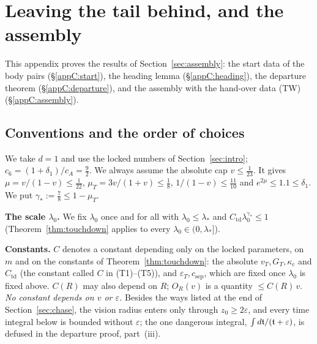 \section{Leaving the tail behind, and the assembly}\label{app:C}

This appendix proves the results of Section~\ref{sec:assembly}: the start data of the body pairs
(\S\ref{appC:start}), the heading lemma (\S\ref{appC:heading}), the departure theorem (\S\ref{appC:departure}), and the
assembly with the hand-over data (TW) (\S\ref{appC:assembly}).

\subsection{Conventions and the order of choices}\label{appC:conv}

We take $d=1$ and use the locked numbers of Section~\ref{sec:intro}; $c_6=(1+\delta_1)/c_A=\frac92$. We always
assume the absolute cap
$v\le\frac1{23}$. It gives $\mu=v/(1-v)\le\frac1{22}$, $\mu_T=3v/(1+v)\le\frac18$, $1/(1-v)\le\frac{11}{10}$ and
$e^{2\mu}\le1.1\le\delta_1$. We put $\gamma_*:=\frac78\le1-\mu_T$.

\textbf{The scale $\lambda_0$.} We fix $\lambda_0$ once and for all with $\lambda_0\le\lambda_*$ and
$C_{\mathrm{td}}\lambda_0^{\gamma_*}\le1$ (Theorem~\ref{thm:touchdown} applies to every $\lambda_0\in(0,\lambda_*]$).

\textbf{Constants.} $C$ denotes a constant depending only on the locked parameters, on $m$ and on the constants of
Theorem~\ref{thm:touchdown}: the absolute $v_T,G_T,\kappa_c$ and $C_{\mathrm{td}}$ (the constant called $C$ in
(T1)--(T5)), and $\varepsilon_T,c_{\mathrm{sep}}$, which are fixed once $\lambda_0$ is fixed above. $C(R)$ may also
depend on $R$; $O_R(v)$ is a quantity $\le C(R)\,v$. \emph{No constant depends on $v$ or $\varepsilon$.} Besides the
ways listed at the end of Section~\ref{sec:chase}, the vision radius enters only through $z_0\ge2\varepsilon$, and every
time integral below is bounded without $\varepsilon$; the one dangerous integral, $\int d\mathfrak{t}/(\mathfrak{t}+\varepsilon)$, is
defused in the departure proof, part~(iii).

